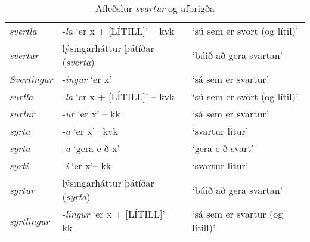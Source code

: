 \documentclass[../samsetningasafn.tex]{subfiles}
\begin{document}
\begin{table}[ht!]
\begin{footnotesize}
\begin{tcolorbox}
\begin{center}
\begin{tabularx}{\textwidth}{Xll}
	\textit{svertla}		&	-\textit{la} \lq er x + [LÍTILL]\rq{} -- kvk	&	\lq sú sem er svört (og lítil)\rq	\\
	\textit{svertur}		&	lýsingarháttur þátíðar (\textit{sverta})		&	\lq búið að gera svartan\rq	\\
	\textit{Svertingur}	&	-\textit{ingur} \lq er x\rq					&	\lq sá sem er svartur\rq	\\
	\textit{surtla}		&	-\textit{la} \lq er x + [LÍTILL]\rq{} -- kvk	&	\lq sú sem er svört (og lítil)\rq	\\
	\textit{surtur}		&	-\textit{ur} \lq er x\rq{} -- kk				&	\lq sá sem er svartur\rq	\\
	\textit{syrta}		&	-\textit{a} \lq er x\rq -- kvk				&	\lq svartur litur\rq	\\
	\textit{syrta}		&	-\textit{a} \lq gera e-ð x\rq				&	\lq gera e-ð svart\rq	\\
	\textit{syrti}			&	-\textit{i} \lq er x\rq -- kk					&	\lq svartur litur\rq	\\
	\textit{syrtur}		&	lýsingarháttur þátíðar (\textit{syrta})		&	\lq búið að gera svartan\rq	\\
	\textit{syrtlingur}	&	-\textit{lingur} \lq er x + [LÍTILL]\rq{} -- kk	&	\lq sá sem er svartur (og lítill)\rq	\\
	\end{tabularx}
	\end{center}
\end{tcolorbox}
\end{footnotesize}
	\caption{Afleðslur \textit{svartur} og afbrigða}
	\label{tafla:svafl}
\end{table}
\end{document}
